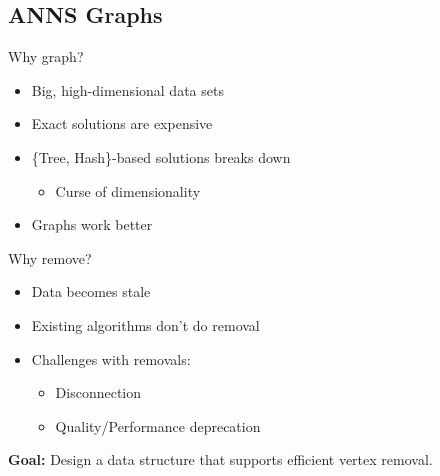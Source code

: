 \subsection{ANNS Graphs}

\begin{frame}{Why graph?}
    \begin{itemize}
        \item Big, high-dimensional data sets
        \item Exact solutions are expensive
        \item \{Tree, Hash\}-based solutions breaks down
            \begin{itemize}
                \item Curse of dimensionality
            \end{itemize}
        \item Graphs work better
    \end{itemize}
\end{frame}

\begin{frame}{Why remove?}
    \begin{itemize}
        \item Data becomes stale
        \item Existing algorithms don't do removal
        \item Challenges with removals:
            \begin{itemize}
                \item Disconnection
                \item Quality/Performance deprecation
            \end{itemize}
    \end{itemize}
\end{frame}

\begin{frame}
    \centering
    \textbf{Goal:} Design a data structure that supports efficient vertex removal.
\end{frame}
